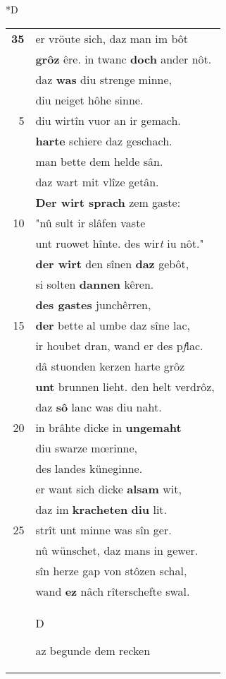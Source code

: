 \documentclass[8pt,a4paper,notitlepage]{article}
\begin{document}
\begin{table}[ht]
\begin{minipage}[t]{0.5\linewidth}
\small
\begin{center}*D
\end{center}
\begin{tabular}{rl}
\textbf{35} & er vröute sich, daz man im bôt\\ 
 & \textbf{grôz} êre. in twanc \textbf{doch} ander nôt.\\ 
 & daz \textbf{was} diu strenge minne,\\ 
 & diu neiget hôhe sinne.\\ 
5 & diu wirtîn vuor an ir gemach.\\ 
 & \textbf{harte} schiere daz geschach.\\ 
 & man bette dem helde sân.\\ 
 & daz wart mit vlîze getân.\\ 
 & \textbf{Der wirt sprach} zem gaste:\\ 
10 & "nû sult ir slâfen vaste\\ 
 & unt ruowet hînte. des wir\textit{t} iu nôt."\\ 
 & \textbf{der wirt} den sînen \textbf{daz} gebôt,\\ 
 & si solten \textbf{dannen} kêren.\\ 
 & \textbf{des gastes} junchêrren,\\ 
15 & \textbf{der} bette al umbe daz sîne lac,\\ 
 & ir houbet dran, wand er des p\textit{f}lac.\\ 
 & dâ stuonden kerzen harte grôz\\ 
 & \textbf{unt} brunnen lieht. den helt verdrôz,\\ 
 & daz \textbf{sô} lanc was diu naht.\\ 
20 & in brâhte dicke in \textbf{ungemaht}\\ 
 & diu swarze mœrinne,\\ 
 & des landes küneginne.\\ 
 & er want sich dicke \textbf{alsam} wit,\\ 
 & daz im \textbf{kracheten} \textbf{diu} lit.\\ 
25 & strît unt minne was sîn ger.\\ 
 & nû wünschet, daz mans in gewer.\\ 
 & sîn herze gap von stôzen schal,\\ 
 & wand \textbf{ez} nâch rîterschefte swal.\\ 
 & \begin{large}D\end{large}az begunde dem recken\\ 

\end{tabular}
\end{minipage}
\end{table}
\end{document}
